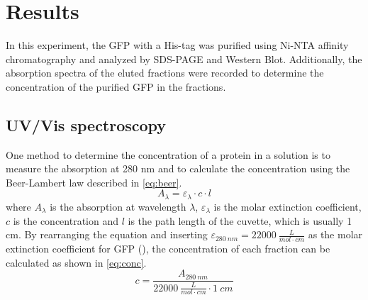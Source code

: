 \documentclass[a4paper,12pt,bibliography=totocnumbered,parskip=half,headsepline]{scrartcl}
\begin{document}
\newpage

\section{Results}
In this experiment, the GFP with a His-tag was purified using Ni-NTA affinity chromatography and analyzed by SDS-PAGE and Western Blot. Additionally, the absorption spectra of the eluted fractions were recorded to determine the concentration of the purified GFP in the fractions.

\subsection{UV/Vis spectroscopy}
One method to determine the concentration of a protein in a solution is to measure the absorption at 280 nm and to calculate the concentration using the Beer-Lambert law described in \autoref{eq:beer}.
\begin{equation}
    A_\lambda = \varepsilon_\lambda \cdot c \cdot l
    \label{eq:beer}
\end{equation}
where $A_{\lambda}$ is the absorption at wavelength $\lambda$, $\varepsilon_{\lambda}$ is the molar extinction coefficient, $c$ is the concentration and $l$ is the path length of the cuvette, which is usually 1 cm.
By rearranging the equation and inserting $\varepsilon_{\SI{280}{nm}} = \SI{22000}{\frac{L}{mol \cdot cm}}$ as the molar extinction coefficient for GFP (\cite{Skript}), the concentration of each fraction can be calculated as shown in \autoref{eq:conc}.
\begin{equation}    
    c = \frac{A_{\SI{280}{nm}}}{\SI{22000}{\frac{L}{mol \cdot cm}} \cdot \SI{1}{cm}}
    \label{eq:conc}
\end{equation}
\end{document}
